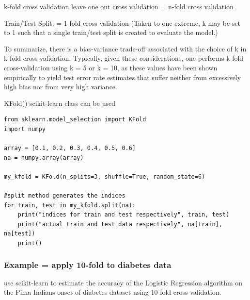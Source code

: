 \documentclass[11pt]{article}
\begin{document}
k-fold cross validation
leave one out cross validation = n-fold cross validation

Train/Test Split: = 1-fold cross validation
(Taken to one extreme, k may be set to 1 such that a single train/test split is created to evaluate the model.)

To summarize, there is a bias-variance trade-off associated with the
choice of k in k-fold cross-validation. Typically, given these
considerations, one performs k-fold cross-validation using k = 5 or k
= 10, as these values have been shown empirically to yield test error
rate estimates that suffer neither from excessively high bias nor from
very high variance.

KFold() scikit-learn class can be used

\begin{verbatim}
from sklearn.model_selection import KFold
import numpy

array = [0.1, 0.2, 0.3, 0.4, 0.5, 0.6]
na = numpy.array(array)

my_kfold = KFold(n_splits=3, shuffle=True, random_state=6)

#split method generates the indices
for train, test in my_kfold.split(na):
    print("indices for train and test respectively", train, test)
    print("actual train and test data respectively", na[train], na[test])
    print()

\end{verbatim}


\subsubsection{Example = apply 10-fold to diabetes data}
\label{sec:orge9a9fea}
use scikit-learn to estimate the accuracy of the Logistic Regression
algorithm on the Pima Indians onset of diabetes dataset using 10-fold
cross validation.
\end{document}
